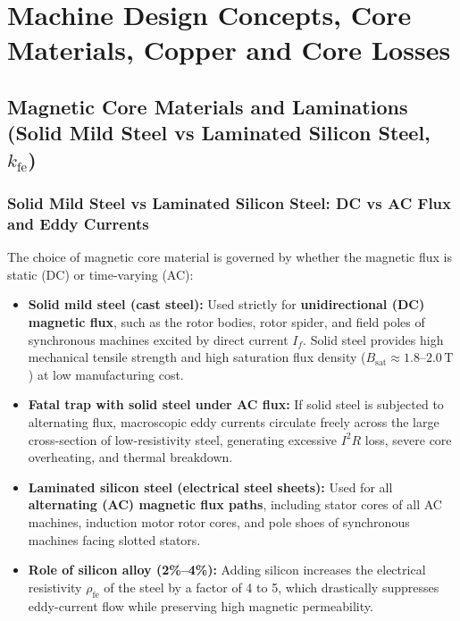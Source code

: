 \section{Machine Design Concepts, Core Materials, Copper and Core Losses}

\subsection{Magnetic Core Materials and Laminations (Solid Mild Steel vs Laminated Silicon Steel, $k_{\mathrm{fe}}$)}

\subsubsection{Solid Mild Steel vs Laminated Silicon Steel: DC vs AC Flux and Eddy Currents}
The choice of magnetic core material is governed by whether the magnetic flux is static (DC) or time-varying (AC):
\begin{itemize}
  \item \textbf{Solid mild steel (cast steel):} Used strictly for \textbf{unidirectional (DC) magnetic flux}, such as the rotor bodies, rotor spider, and field poles of synchronous machines excited by direct current $I_f$. Solid steel provides high mechanical tensile strength and high saturation flux density ($B_{\mathrm{sat}} \approx 1.8\text{--}2.0\,\mathrm{T}$) at low manufacturing cost.
  \item \textbf{Fatal trap with solid steel under AC flux:} If solid steel is subjected to alternating flux, macroscopic eddy currents circulate freely across the large cross-section of low-resistivity steel, generating excessive $I^2 R$ loss, severe core overheating, and thermal breakdown.
  \item \textbf{Laminated silicon steel (electrical steel sheets):} Used for all \textbf{alternating (AC) magnetic flux paths}, including stator cores of all AC machines, induction motor rotor cores, and pole shoes of synchronous machines facing slotted stators.
  \item \textbf{Role of silicon alloy (2\%--4\%):} Adding silicon increases the electrical resistivity $\rho_{\mathrm{fe}}$ of the steel by a factor of 4 to 5, which drastically suppresses eddy-current flow while preserving high magnetic permeability.
\end{itemize}

